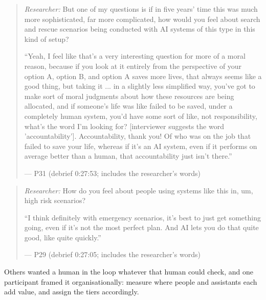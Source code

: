 \begin{quote}\small
{\footnotesize\textit{Researcher:} But one of my questions is if in five years' time this was much more sophisticated, far more complicated, how would you feel about search and rescue scenarios being conducted with AI systems of this type in this kind of setup?}\par\smallskip
``Yeah, I feel like that's a very interesting question for more of a moral reason, because if you look at it entirely from the perspective of your option A, option B, and option A saves more lives, that always seems like a good thing, but taking it ... in a slightly less simplified way, you've got to make sort of moral judgments about how these resources are being allocated, and if someone's life was like failed to be saved, under a completely human system, you'd have some sort of like, not responsibility, what's the word I'm looking for? [interviewer suggests the word 'accountability']. Accountability, thank you! Of who was on the job that failed to save your life, whereas if it's an AI system, even if it performs on average better than a human, that accountability just isn't there.''\par\hfill--- P31 (debrief 0:27:53; includes the researcher's words)
\end{quote}

\begin{quote}\small
{\footnotesize\textit{Researcher:} How do you feel about people using systems like this in, um, high risk scenarios?}\par\smallskip
``I think definitely with emergency scenarios, it's best to just get something going, even if it's not the most perfect plan. And AI lets you do that quite good, like quite quickly.''\par\hfill--- P29 (debrief 0:27:05; includes the researcher's words)
\end{quote}


\label{sec:qual:who-decides:loop}
Others wanted a human in the loop whatever that human could check, and one participant framed it organisationally: measure where people and assistants each add value, and assign the tiers accordingly.

